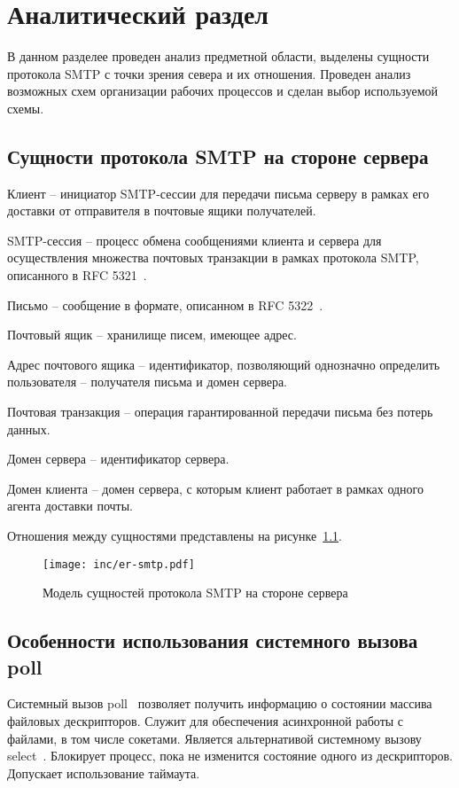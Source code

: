 \chapter{Аналитический раздел}
\label{cha:analysis}

В данном разделее проведен анализ предметной области, выделены сущности протокола SMTP с точки зрения севера и их отношения.
Проведен анализ возможных схем организации рабочих процессов и сделан выбор используемой схемы.

\section{Сущности протокола SMTP на стороне сервера}

Клиент -- инициатор SMTP-сессии для передачи письма серверу в рамках его доставки от отправителя в почтовые ящики получателей.

SMTP-сессия -- процесс обмена сообщениями клиента и сервера для осуществления множества почтовых транзакции в рамках протокола SMTP, описанного в RFC 5321~\cite{RFC-5321}.

Письмо -- сообщение в формате, описанном в RFC 5322~\cite{RFC-5322}.

Почтовый ящик -- хранилище писем, имеющее адрес.

Адрес почтового ящика -- идентификатор, позволяющий однозначно определить пользователя -- получателя письма и домен сервера.

Почтовая транзакция -- операция гарантированной передачи письма без потерь данных.

Домен сервера -- идентификатор сервера.

Домен клиента -- домен сервера, с которым клиент работает в рамках одного агента доставки почты.

Отношения между сущностями представлены на рисунке~\ref{fig:er-smtp}.

\begin{figure}[ht!]
	\centering
	\texttt{[image: inc/er-smtp.pdf]}
	\caption{Модель сущностей протокола SMTP на стороне сервера}
	\label{fig:er-smtp}
\end{figure}

\section{Особенности использования системного вызова poll}

Системный вызов poll~\cite{poll} позволяет получить информацию о состоянии массива файловых дескрипторов.
Служит для обеспечения асинхронной работы с файлами, в том числе сокетами.
Является альтернативой системному вызову select~\cite{select}.
Блокирует процесс, пока не изменится состояние одного из дескрипторов.
Допускает использование таймаута.

